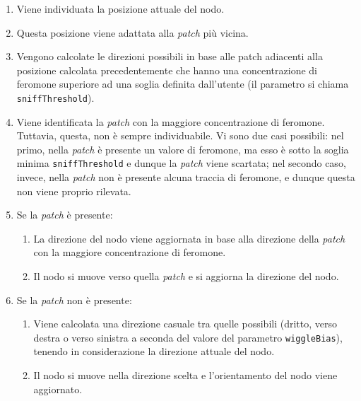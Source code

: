 \begin{enumerate}
    \item Viene individuata la posizione attuale del nodo.
    \item Questa posizione viene adattata alla \textit{patch} più vicina.
    \item Vengono calcolate le direzioni possibili in base alle patch adiacenti alla posizione calcolata precedentemente che hanno una 
    concentrazione di feromone superiore ad una soglia definita dall'utente (il parametro si chiama \texttt{sniffThreshold}).
    \item Viene identificata la \textit{patch} con la maggiore concentrazione di feromone. Tuttavia, questa, non è sempre individuabile. Vi sono due casi possibili: nel primo, 
        nella \textit{patch} è presente un valore di feromone, ma esso è sotto la soglia minima \texttt{sniffThreshold} e dunque la \textit{patch} viene scartata;
         nel secondo caso, invece, nella \textit{patch} non è presente alcuna traccia di feromone, e dunque questa non viene proprio rilevata.
    \item Se la \textit{patch} è presente:
    \begin{enumerate}
        \item La direzione del nodo viene aggiornata in base alla direzione della \textit{patch} con la maggiore concentrazione di feromone.
        \item Il nodo si muove verso quella \textit{patch} e si aggiorna la direzione del nodo.
    \end{enumerate}
    \item Se la \textit{patch} non è presente:
    \begin{enumerate}
        \item Viene calcolata una direzione casuale tra quelle possibili (dritto, verso destra o verso sinistra a seconda del valore del parametro \texttt{wiggleBias}),
        tenendo in considerazione la direzione attuale del nodo.
        \item Il nodo si muove nella direzione scelta e l'orientamento del nodo viene aggiornato.
    \end{enumerate}
\end{enumerate}

